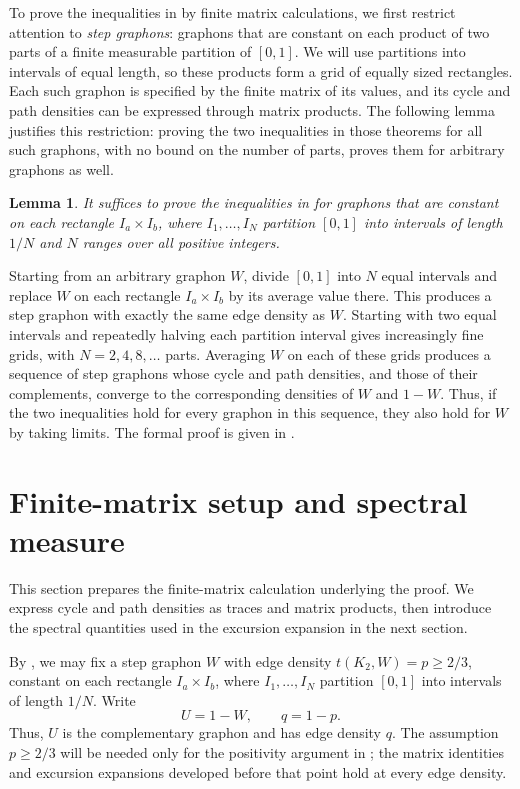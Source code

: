 \documentclass[11pt]{article}
\newtheorem{lemma}[theorem]{Lemma}
\theoremstyle{remark}
\numberwithin{equation}{section}
\newcommand{\edens}[1]{t(K_{2},#1)}
\begin{document}
To prove the inequalities in  by finite matrix calculations, we first restrict attention to \emph{step graphons}: graphons that are constant on each product of two parts of a finite measurable partition of $[0,1]$.
We will use partitions into intervals of equal length, so these products form a grid of equally sized rectangles.
Each such graphon is specified by the finite matrix of its values, and its cycle and path densities can be expressed through matrix products.
The following lemma justifies this restriction: proving the two inequalities in those theorems for all such graphons, with no bound on the number of parts, proves them for arbitrary graphons as well.

\begin{lemma}
\label{lem:step-reduction}
  It suffices to prove the inequalities in  for graphons that
  are constant on each rectangle $I_a\times I_b$, where
  $I_1,\ldots,I_N$ partition $[0,1]$ into intervals of length $1/N$
  and $N$ ranges over all positive integers.
\end{lemma}
Starting from an arbitrary graphon $W$, divide $[0,1]$ into $N$ equal intervals and replace $W$ on each rectangle $I_a\times I_b$ by its average value there.
This produces a step graphon with exactly the same edge density as $W$.
Starting with two equal intervals and repeatedly halving each partition interval gives increasingly fine grids, with $N=2,4,8,\ldots$ parts.
Averaging $W$ on each of these grids produces a sequence of step graphons whose cycle and path densities, and those of their complements, converge to the corresponding densities of $W$ and $1-W$.
Thus, if the two inequalities hold for every graphon in this sequence, they also hold for $W$ by taking limits.
The formal proof is given in .

\section{Finite-matrix setup and spectral measure}
\label{sec:matrix-reduction}

This section prepares the finite-matrix calculation underlying the proof.
We express cycle and path densities as traces and matrix products, then introduce the spectral quantities used in the excursion expansion in the next section.

By , we may fix a step graphon $W$ with edge density $\edens W=p\ge2/3$, constant on each rectangle $I_a\times I_b$, where $I_1,\ldots,I_N$ partition $[0,1]$ into intervals of length $1/N$.
Write
\[
  U=1-W,
  \qquad
  q=1-p.
\]
Thus, $U$ is the complementary graphon and has edge density $q$.
The assumption $p\ge2/3$ will be needed only for the positivity argument in ; the matrix identities and excursion expansions developed before that point hold at every edge density.
\end{document}
